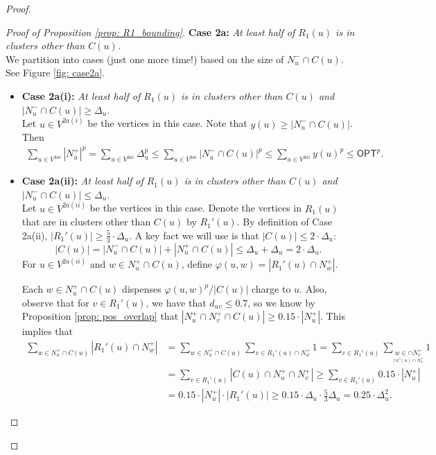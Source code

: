 \documentclass[11pt]{article}
\begin{document}
\begin{proof}
\begin{proof}[Proof of Proposition \ref{prop: R1_bounding}]
\noindent\textbf{Case 2a:} \emph{ At least half of $R_1(u)$ is in clusters other than $C(u)$.} \\
We partition into cases (just one more time!) based on the size of $N_u^- \cap C(u)$. See Figure \ref{fig: case2a}.
    \begin{itemize}
        \item \textbf{Case 2a(i):} \emph{At least half of $R_1(u)$ is in clusters other than $C(u)$ and $|N_u^- \cap C(u)| \geq \Delta_u$. }\\
        Let $ u \in  V^{2a(i)}$ be the vertices in this case.
        Note that $y(u) \geq |N_u^- \cap C(u)|$. Then
        \begin{align*}
        \boxed{
        \sum_{ u \in  V^{2ai}} |N_u^+|^p 
        = \sum_{ u \in  V^{2ai}} \Delta_u^p 
        \leq \sum_{ u \in  V^{2ai}} |N_u^- \cap C(u)|^p 
        \leq \sum_{ u \in  V^{2ai}} y(u)^p 
        \leq \textsf{OPT}^p.}
        \end{align*}
        \item \textbf{Case 2a(ii):}\emph{ At least half of $R_1(u)$ is in clusters other than $C(u)$ and $|N_u^- \cap C(u)| \leq \Delta_u$.}\\ 

        Let $ u \in  V^{2a(ii)}$ be the vertices in this case.
    Denote the vertices in $R_1(u)$ that are in clusters other than $C(u)$ by $R_1'(u)$. By definition of Case 2a(ii), $|R_1'(u)| \geq \frac{5}{3} \cdot \Delta_u$. 
        A key fact we will use is that $|C(u)| \leq 2 \cdot \Delta_u$:
        $$|C(u)| = |N_u^- \cap C(u)| + |N_u^+ \cap C(u)| \leq \Delta_u + \Delta_u = 2 \cdot \Delta_u.$$
        For $u \in  V^{2a(ii)}$ and $w \in N_u^+ \cap C(u)$, define 
        $\varphi(u,w) = |R_1'(u) \cap N_w^+|.$


        Each $w \in N_u^+ \cap C(u)$ dispenses 
        $\varphi(u,w)^p/|C(u)|$ charge to $u$. Also, observe that for $v \in R_1'(u)$, we have that $d_{uv} \leq 0.7$, so we know by Proposition \ref{prop: pos_overlap} that $|N_u^+ \cap N_v^+ \cap C(u)| \geq 0.15 \cdot |N_u^+|$. This implies that 
                \begin{align*}\sum_{w \in N_u^+ \cap C(u)} |R_1'(u)  \cap N_w^+|  
                &= \sum_{w \in N_u^+ \cap C(u)} \sum_{v \in R_1'(u)  \cap N_w^+} 1  
                = \sum_{v \in R_1'(u)} \sum_{\underset{ \cap C(u) \cap N_u^+}{w \in  \cap N_v^+}} 1 \\
               & = \sum_{v \in R_1'(u)} | C(u) \cap N_u^+ \cap N_v^+| \geq 
                \sum_{v \in R_1'(u)} 0.15\cdot | N_u^+ | \\
                &= 
                 0.15 \cdot |N_u^+| \cdot |R_1'(u)| \geq 0.15 \cdot \Delta_u \cdot \frac{5}{3}\Delta_u = 0.25 \cdot \Delta_u^2.
                \end{align*}


\end{itemize}
\end{proof}
\end{proof}
\end{document}
